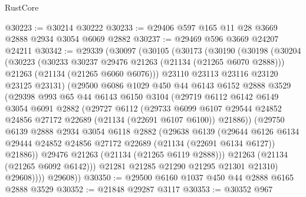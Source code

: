 \begin{lexlean}{RustCore}
\begin{coremodule}
@30223 := @30214 @30222
@30233 := @29406 @597 @165 @11 @28 @3669 @2888 @2934 @3054 @6069 @2882
@30237 := @29469 @596 @3669 @24207 @24211
@30342 := @29339
    (@30097
      (@30105
        (@30173
          (@30190
            (@30198
              (@30204
                (@30223
                  (@30233 @30237 @29476 @21263 (@21134 (@21265 @6070 @2888)))
                  @21263
                  (@21134 (@21265 @6060 @6076)))
                @23110
                @23113
                @23116
                @23120
                @23125
                @23131)
              (@29500
                @6086
                @1029
                @450
                @44
                @6143
                @6152
                @2888
                @3529
                (@29398
                  @993
                  @65
                  @44
                  @6143
                  @6150
                  @3104
                  (@29719
                    @6112
                    @6142
                    @6149
                    @3054
                    @6091
                    @2882
                    (@29727
                      @6112
                      (@29733
                        @6099
                        @6107
                        @29544
                        @24852
                        @24856
                        @27172
                        @22689
                        (@21134 (@22691 @6107 @6100))
                        @21886))
                    (@29750
                      @6139
                      @2888
                      @2934
                      @3054
                      @6118
                      @2882
                      (@29638
                        @6139
                        (@29644
                          @6126
                          @6134
                          @29444
                          @24852
                          @24856
                          @27172
                          @22689
                          (@21134 (@22691 @6134 @6127))
                          @21886))
                      @29476
                      @21263
                      (@21134 (@21265 @6119 @2888)))
                    @21263
                    (@21134 (@21265 @6092 @6142)))
                  @21281
                  @21285
                  @21290
                  @21295
                  @21301
                  @21310)
                @29608))))
        @29608))
@30350 := @29500 @6160 @1037 @450 @44 @2888 @6165 @2888 @3529
@30352 := @21848 @29287 @3117
@30353 := @30352 @967

\end{coremodule}
\end{lexlean}
